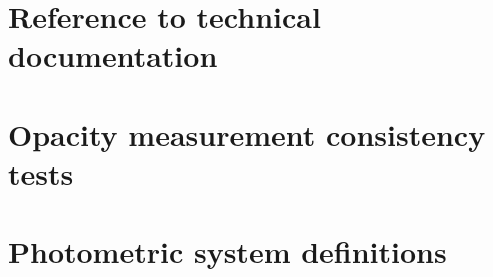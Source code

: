 \documentclass[a4paper, 11pt]{report}
\begin{document}
  \section{Reference to technical documentation}
  \label{ap:doc}
  

  \section{Opacity measurement consistency tests}
  \label{ap:opacity}
  
  \clearpage
  
  
  \clearpage
  
  \section{Photometric system definitions}
  \label{ap:cal_HA}
  
  
  

  
  
  \label{ap:cal_JFL}
  \clearpage
  
  
  
  \clearpage
  

  

  

  

\clearpage

%



\end{document}
